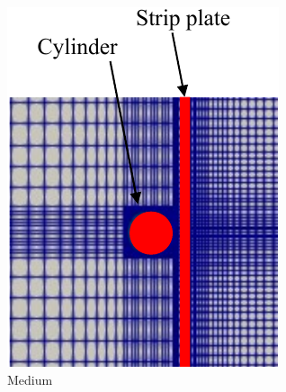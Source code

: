 \documentclass[oneside]{utmthesis}
\begin{document}
\begin{figure}[!h]
\begin{subfigure}[h]{0.3\textwidth}
    \includegraphics[width=\textwidth]{figs/threeGridsMedium}
    \caption{Medium}
    \label{fig:mediumMesh}
  \end{subfigure} \hspace{0.25cm}
  \begin{subfigure}[h]{0.3\textwidth}

\end{subfigure}
\end{figure}
\end{document}
